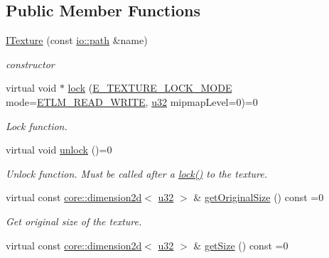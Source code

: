 \subsection*{Public Member Functions}
\begin{DoxyCompactItemize}
\item 
\mbox{\label{classirr_1_1video_1_1ITexture_a32dbd62fef8a65f11e5b440706346c90}} 
\hyperlink{classirr_1_1video_1_1ITexture_a32dbd62fef8a65f11e5b440706346c90}{I\+Texture} (const \hyperlink{namespaceirr_1_1io_a6468281622ce3a1c46b72e19f32dded5}{io\+::path} \&name)
\begin{DoxyCompactList}\small\item\em constructor \end{DoxyCompactList}\item 
virtual void $\ast$ \hyperlink{classirr_1_1video_1_1ITexture_aa09ee89973a645ebdd2bd61ed859df38}{lock} (\hyperlink{namespaceirr_1_1video_a3916d259e8fe0d0d02e8ee0adc8af5bc}{E\+\_\+\+T\+E\+X\+T\+U\+R\+E\+\_\+\+L\+O\+C\+K\+\_\+\+M\+O\+DE} mode=\hyperlink{namespaceirr_1_1video_a3916d259e8fe0d0d02e8ee0adc8af5bcad742bd0e885e6a08c86b8d3d5c601952}{E\+T\+L\+M\+\_\+\+R\+E\+A\+D\+\_\+\+W\+R\+I\+TE}, \hyperlink{namespaceirr_a0416a53257075833e7002efd0a18e804}{u32} mipmap\+Level=0)=0
\begin{DoxyCompactList}\small\item\em Lock function. \end{DoxyCompactList}\item 
virtual void \hyperlink{classirr_1_1video_1_1ITexture_a15b9a25aa18528ade37a492bd7b20a10}{unlock} ()=0
\begin{DoxyCompactList}\small\item\em Unlock function. Must be called after a \hyperlink{classirr_1_1video_1_1ITexture_aa09ee89973a645ebdd2bd61ed859df38}{lock()} to the texture. \end{DoxyCompactList}\item 
virtual const \hyperlink{classirr_1_1core_1_1dimension2d}{core\+::dimension2d}$<$ \hyperlink{namespaceirr_a0416a53257075833e7002efd0a18e804}{u32} $>$ \& \hyperlink{classirr_1_1video_1_1ITexture_adbb05bcee8ec7fa11bb4ccfdb725cda8}{get\+Original\+Size} () const =0
\begin{DoxyCompactList}\small\item\em Get original size of the texture. \end{DoxyCompactList}\item 
virtual const \hyperlink{classirr_1_1core_1_1dimension2d}{core\+::dimension2d}$<$ \hyperlink{namespaceirr_a0416a53257075833e7002efd0a18e804}{u32} $>$ \& \hyperlink{classirr_1_1video_1_1ITexture_adfcf9558c0f1ae543782c03f7903c48e}{get\+Size} () const =0

\end{DoxyCompactItemize}

